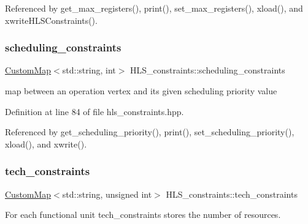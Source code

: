 Referenced by get\+\_\+max\+\_\+registers(), print(), set\+\_\+max\+\_\+registers(), xload(), and xwrite\+H\+L\+S\+Constraints().

\mbox{\label{classHLS__constraints_a8cbded9579c7865e1e2eba41cf763271}} 
\subsubsection{\texorpdfstring{scheduling\+\_\+constraints}{scheduling\_constraints}}
{\footnotesize\ttfamily \hyperlink{custom__map_8hpp_a18ca01763abbe3e5623223bfe5aaac6b}{Custom\+Map}$<$std\+::string, int$>$ H\+L\+S\+\_\+constraints\+::scheduling\+\_\+constraints\hspace{0.3cm}{\ttfamily [private]}}



map between an operation vertex and its given scheduling priority value 



Definition at line 84 of file hls\+\_\+constraints.\+hpp.



Referenced by get\+\_\+scheduling\+\_\+priority(), print(), set\+\_\+scheduling\+\_\+priority(), xload(), and xwrite().

\mbox{\label{classHLS__constraints_a9c622d8a77390c41a8abf51d989ca7ee}} 
\subsubsection{\texorpdfstring{tech\+\_\+constraints}{tech\_constraints}}
{\footnotesize\ttfamily \hyperlink{custom__map_8hpp_a18ca01763abbe3e5623223bfe5aaac6b}{Custom\+Map}$<$std\+::string, unsigned int$>$ H\+L\+S\+\_\+constraints\+::tech\+\_\+constraints\hspace{0.3cm}{\ttfamily [private]}}



For each functional unit tech\+\_\+constraints stores the number of resources. 



